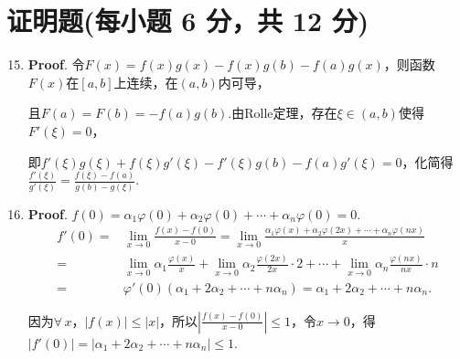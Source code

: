 \documentclass[../Main.tex]{subfiles}
\begin{document}
\section{证明题(每小题 6 分，共 12 分)}
\begin{enumerate}
    \setcounter{enumi}{14}
    \item \textbf{Proof}. 令$F(x)=f(x)g(x)-f(x)g(b)-f(a)g(x)$，则函数$F(x)$在$[
                  a,b]$上连续，在$(a,b)$内可导，

          且$F(a)=F(b)=-f(a)g(b)$.由Rolle定理，存在$\xi\in(a,b)$使得$F'(\xi)=0$，

          即$f'(\xi)g(\xi)+f(\xi)g'(\xi)-f'(\xi)g(b)-f(a)g'(\xi)=0$，化简得$\frac{f'(\xi)}{g'(\xi)}
              =\frac{f(\xi)-f(a)}{g(b)-g(\xi)}$.

    \item \textbf{Proof}. $f(0)=\alpha_{1}\varphi(0)+\alpha_{2}\varphi(0)+\cdots
              +\alpha_{n}\varphi(0)=0$.
          \[
              \begin{aligned}
                  f'(0)= & \lim_{x\to0}\frac{f(x)-f(0)}{x-0}=\lim_{x\to0}\frac{\alpha_1\varphi(x)+\alpha_2\varphi(2x)+\cdots+\alpha_n\varphi(nx)}{x}                                  \\
                  =      & \lim_{x\to 0}\alpha_{1}\frac{\varphi(x)}{x}+\lim_{x\to0}\alpha_{2}\frac{\varphi(2x)}{2x}\cdot 2+\cdots+\lim_{x\to0}\alpha_{n}\frac{\varphi(nx)}{nx}\cdot n \\
                  =      & \varphi'(0)\left(\alpha_{1}+2\alpha_{2}+\cdots+n\alpha_{n}\right)=\alpha_{1}+2\alpha_{2}+\cdots+n\alpha_{n}.
              \end{aligned}
          \]

          因为$\forall\,x$，$|f(x)|\leq |x|$，所以$\left|\frac{f(x)-f(0)}{x-0}\right|
              \leq 1$，令$x\to0$，得$|f'(0)|=|\alpha_{1}+2\alpha_{2}+\cdots+n\alpha_{n}|\leq
              1$.
\end{enumerate}
\end{document}
